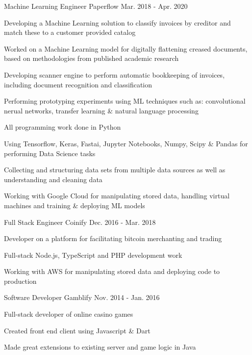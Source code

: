 \begin{cventries}
\cventry
{Machine Learning Engineer} %
{Paperflow} %
{} %
{Mar. 2018 - Apr. 2020} %
{ %
\begin{cvitems}
\item {Developing a Machine Learning solution to classify invoices by creditor and match these to a customer provided catalog}
\item {Worked on a Machine Learning model for digitally flattening creased documents, based on methodologies from published academic research}
\item {Developing scanner engine to perform automatic bookkeeping of invoices, including document recognition and classification}
\item {Performing prototyping experiments using ML techniques such as: convolutional nerual networks, transfer learning \& natural language processing}
\item {All programming work done in Python}
\item {Using Tensorflow, Keras, Fastai, Jupyter Notebooks, Numpy, Scipy \& Pandas for performing Data Science tasks}
\item {Collecting and structuring data sets from multiple data sources as well as understanding and cleaning data}
\item {Working with Google Cloud for manipulating stored data, handling virtual machines and training \& deploying ML models}
\end{cvitems}
}

\cventry
{Full Stack Engineer} %
{Coinify} %
{} %
{Dec. 2016 - Mar. 2018} %
{ %
\begin{cvitems}
\item {Developer on a platform for facilitating bitcoin merchanting and trading}
\item {Full-stack Node.js, TypeScript and PHP development work}
\item {Working with AWS for manipulating stored data and deploying code to production}
\end{cvitems}
}

\cventry
{Software Developer} %
{Gamblify} %
{} %
{Nov. 2014 - Jan. 2016} %
{ %
\begin{cvitems}
\item {Full-stack developer of online casino games}
\item {Created front end client using Javascript \& Dart}
\item {Made great extensions to existing server and game logic in Java}
\end{cvitems}
}


\end{cventries}
